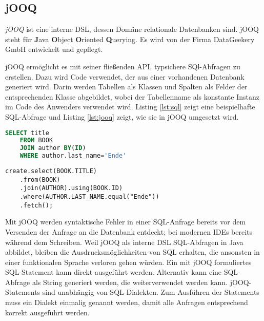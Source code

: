 \subsection{jOOQ}
\emph{jOOQ}\texttrademark \cite{www:jooq:home} ist eine interne DSL, dessen Domäne relationale Datenbanken sind. jOOQ steht für \textbf{J}ava \textbf{O}bject \textbf{O}riented \textbf{Q}uerying. Es wird von der Firma DataGeekery GmbH \cite{www:datageekery} entwickelt und gepflegt.

jOOQ ermöglicht es mit seiner fließenden API, typsichere SQl-Abfragen zu erstellen. Dazu wird Code verwendet, der aus einer vorhandenen Datenbank generiert wird. Darin werden Tabellen als Klassen und Spalten als Felder der entsprechenden Klasse abgebildet, wobei der Tabellenname als konstante Instanz im Code des Anwenders verwendet wird.
Listing \ref{lst:sql} zeigt eine beispielhafte SQL-Abfrage und Listing \ref{lst:jooq} zeigt, wie sie in jOOQ umgesetzt wird.


\begin{lstlisting}[caption={Code einer SQL-Abfrage}, language=SQL, label=lst:sql]
	SELECT title
	FROM BOOK
	JOIN author BY(ID)
	WHERE author.last_name='Ende'
\end{lstlisting}

\begin{lstlisting}[caption={Code der SQL-Abfrage implementiert mit jOOQ}, label=lst:jooq]
	create.select(BOOK.TITLE)
	.from(BOOK)
	.join(AUTHOR).using(BOOK.ID)
	.where(AUTHOR.LAST_NAME.equal("Ende"))
	.fetch();
\end{lstlisting}

Mit jOOQ werden syntaktische Fehler in einer SQL-Anfrage bereits vor dem Versenden der Anfrage an die Datenbank entdeckt; bei modernen IDEs bereits während dem Schreiben. Weil jOOQ als interne DSL SQL-Abfragen in Java abbildet, bleiben die Ausdrucksmöglichkeiten von SQL erhalten, die ansonsten in einer funktionalen Sprache verloren gehen würden. Ein mit jOOQ formuliertes SQL-Statement kann direkt ausgeführt werden. Alternativ kann eine SQL-Abfrage als String generiert werden, die weiterverwendet werden kann. jOOQ-Statements sind unabhängig von SQL-Dialekten. Zum Ausführen der Statements muss ein Dialekt einmalig genannt werden, damit alle Anfragen entsprechend korrekt ausgeführt werden.

